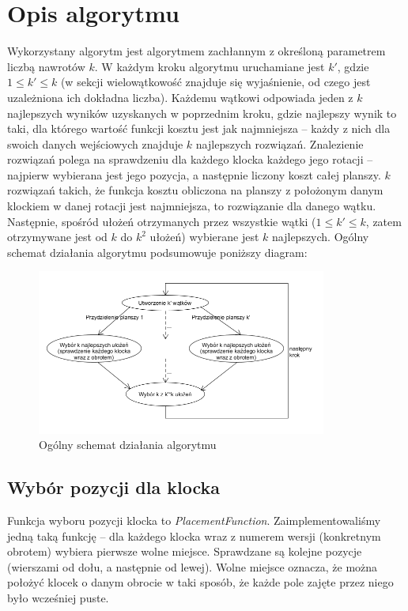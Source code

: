 \documentclass{article}
\begin{document}
\section{Opis algorytmu}
Wykorzystany algorytm jest algorytmem zachłannym z określoną parametrem liczbą nawrotów $k$. W każdym kroku algorytmu uruchamiane jest $k'$, gdzie $1 \le k' \le k$ (w sekcji wielowątkowość znajduje się wyjaśnienie, od czego jest uzależniona ich dokładna liczba). Każdemu wątkowi odpowiada jeden z $k$ najlepszych wyników uzyskanych w poprzednim kroku, gdzie najlepszy wynik to taki, dla którego wartość funkcji kosztu jest jak najmniejsza -- każdy z nich dla swoich danych wejściowych znajduje $k$ najlepszych rozwiązań. Znalezienie rozwiązań polega na sprawdzeniu dla każdego klocka każdego jego rotacji -- najpierw wybierana jest jego pozycja, a następnie liczony koszt całej planszy. $k$ rozwiązań takich, że funkcja kosztu obliczona na planszy z położonym danym klockiem w danej rotacji jest najmniejsza, to rozwiązanie dla danego wątku. Następnie, spośród ułożeń otrzymanych przez wszystkie wątki ($1 \le k' \le k$, zatem otrzymywane jest od $k$ do $k^2$ ułożeń) wybierane jest $k$ najlepszych. Ogólny schemat działania algorytmu podsumowuje poniższy diagram:
\begin{figure}[H]
\begin{center}
\includegraphics[width=0.85\textwidth]{schemat_algorytmu.png}
\end{center}
\caption{Ogólny schemat działania algorytmu}
\end{figure}

\subsection{Wybór pozycji dla klocka}
Funkcja wyboru pozycji klocka to \textit{PlacementFunction}. Zaimplementowaliśmy jedną taką funkcję -- dla każdego klocka wraz z numerem wersji (konkretnym obrotem) wybiera pierwsze wolne miejsce. Sprawdzane są kolejne pozycje (wierszami od dołu, a następnie od lewej). Wolne miejsce oznacza, że można położyć klocek o danym obrocie w taki sposób, że każde pole zajęte przez niego było wcześniej puste.
\end{document}
